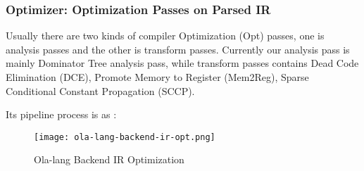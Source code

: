 \subsubsection{Optimizer: Optimization Passes on Parsed IR}

Usually there are two kinds of compiler Optimization (Opt) passes, one is analysis passes and the other is transform passes.
Currently our analysis pass is mainly Dominator Tree analysis pass,
while transform passes contains Dead Code Elimination (DCE), Promote Memory to Register (Mem2Reg), Sparse Conditional Constant Propagation (SCCP).

Its pipeline process is as :
\begin{figure}[!htbp]
    \centering
    \texttt{[image: ola-lang-backend-ir-opt.png]}
    \caption{Ola-lang Backend IR Optimization}
    \label{fig:ola-lang-backend-ir-opt}
\end{figure}
